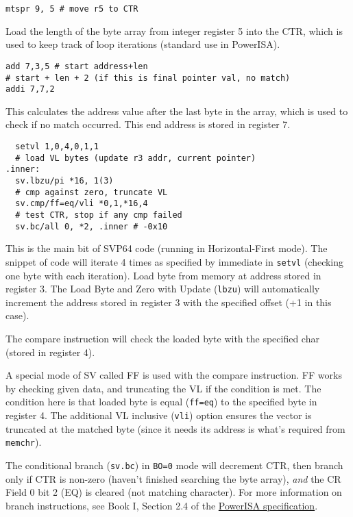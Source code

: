 \begin{verbatim}
mtspr 9, 5 # move r5 to CTR
\end{verbatim}
Load the length of the byte array from integer register 5 into
the \acrfull{CTR}, which is used to keep track of loop iterations
(standard use in PowerISA).

\begin{verbatim}
add 7,3,5 # start address+len
# start + len + 2 (if this is final pointer val, no match)
addi 7,7,2
\end{verbatim}
This calculates the address value after the last byte in the array, which is
used to check if no match occurred. This end address is stored in register 7.

\begin{verbatim}
  setvl 1,0,4,0,1,1
  # load VL bytes (update r3 addr, current pointer)
.inner:
  sv.lbzu/pi *16, 1(3)
  # cmp against zero, truncate VL
  sv.cmp/ff=eq/vli *0,1,*16,4
  # test CTR, stop if any cmp failed
  sv.bc/all 0, *2, .inner # -0x10
\end{verbatim}
This is the main bit of \acrshort{SVP64} code (running in Horizontal-First mode).
The snippet of code will iterate 4 times as specified by immediate
in \texttt{setvl} (checking one byte with each iteration).
Load byte from memory at address stored in register 3.
The Load Byte and Zero with Update (\texttt{lbzu}) will automatically increment
the address stored in register 3 with the specified offset (+1 in this case).

The compare instruction will check the loaded byte with the specified char
(stored in register 4).

A special mode of \acrfull{SV} called \acrfull{FF} is used with
the compare instruction. \acrshort{FF} works by checking given data, and truncating the
\acrfull{VL} if the condition is met. The condition here is that
loaded byte is equal (\texttt{ff=eq}) to the specified byte in register 4.
The additional \acrshort{VL} inclusive (\texttt{vli}) option ensures the vector is
truncated at the matched byte (since it needs its address is what's required
from \texttt{memchr}).

The conditional branch (\texttt{sv.bc}) in \texttt{BO=0} mode will decrement
\acrshort{CTR}, then branch only if \acrshort{CTR} is non-zero (haven't finished searching the
byte array), \textit{and} the \acrfull{CR} Field 0 bit 2 (EQ) is cleared
(not matching character). For more information on branch instructions,
see Book I, Section 2.4 of the
\href{https://openpower.foundation/specifications/isa/}{PowerISA specification}.

